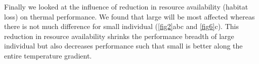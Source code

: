 Finally we looked at the influence of reduction in resource availability (habitat loss) on thermal performance.
We found that large will be most affected whereas there is not much difference for small individual (\cref{fig2}abc and \cref{fig6}c).
 This reduction in resource availability shrinks the performance breadth of large individual but also decreases performance such that small is better along the entire temperature gradient.
